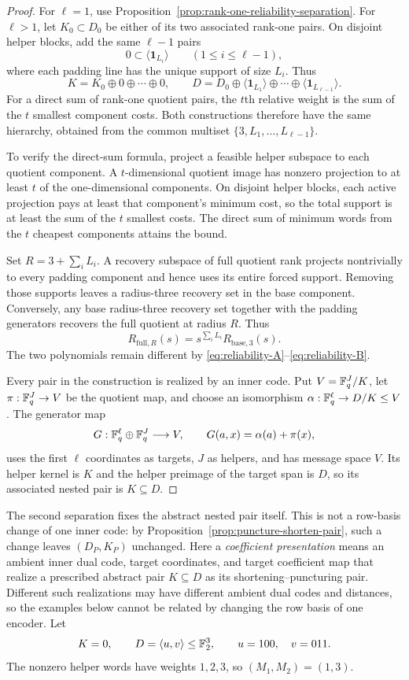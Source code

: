 \begin{proof}
For $\ell=1$, use Proposition~\ref{prop:rank-one-reliability-separation}.
For $\ell>1$, let $K_0\subset D_0$ be either of its two associated rank-one
pairs.  On disjoint helper blocks, add the same $\ell-1$ pairs
\[
 0\subset\langle\mathbf1_{L_i}\rangle
 \qquad(1\leq i\leq\ell-1),
\]
where each padding line has the unique support of size $L_i$.  Thus
\[
 K=K_0\oplus0\oplus\cdots\oplus0,
 \qquad
 D=D_0\oplus\langle\mathbf1_{L_1}\rangle\oplus\cdots
       \oplus\langle\mathbf1_{L_{\ell-1}}\rangle.
\]
For a direct sum of rank-one quotient pairs, the $t$th relative weight is the
sum of the $t$ smallest component costs.  Both constructions therefore have
the same hierarchy, obtained from the common multiset
$\{3,L_1,\ldots,L_{\ell-1}\}$.

To verify the direct-sum formula, project a feasible helper subspace to each
quotient component.  A $t$-dimensional quotient image has nonzero projection
to at least $t$ of the one-dimensional components.  On disjoint helper
blocks, each active projection pays at least that component's minimum cost,
so the total support is at least the sum of the $t$ smallest costs.  The
direct sum of minimum words from the $t$ cheapest components attains the
bound.

Set $R=3+\sum_iL_i$.  A recovery subspace of full quotient rank projects
nontrivially to every padding component and hence uses its entire forced
support.  Removing those supports leaves a radius-three recovery set in the
base component.  Conversely, any base radius-three recovery set together
with the padding generators recovers the full quotient at radius $R$.  Thus
\[
 R_{\mathrm{full},R}(s)
 =s^{\sum_iL_i}R_{\mathrm{base},3}(s).
\]
The two polynomials remain different by
\eqref{eq:reliability-A}--\eqref{eq:reliability-B}.

Every pair in the construction is realized by an inner code.  Put
$V=\mathbb F_q^J/K$, let $\pi:\mathbb F_q^J\to V$ be the quotient map, and choose an
isomorphism $\alpha:\mathbb F_q^\ell\to D/K\leq V$.  The generator map
\[
 G:\mathbb F_q^\ell\oplus\mathbb F_q^J\longrightarrow V,
 \qquad G(a,x)=\alpha(a)+\pi(x),
\]
uses the first $\ell$ coordinates as targets, $J$ as helpers, and has message
space $V$.  Its helper kernel is $K$ and the helper preimage of the target span
is $D$, so its associated nested pair is $K\subseteq D$.
%
%
\end{proof}

The second separation fixes the abstract nested pair itself.  This is not a
row-basis change of one inner code: by
Proposition~\ref{prop:puncture-shorten-pair}, such a change leaves
$(D_P,K_P)$ unchanged.  Here a \emph{coefficient presentation} means an
ambient inner dual code, target coordinates, and target coefficient map that
realize a prescribed abstract pair $K\subseteq D$ as its
shortening--puncturing pair.  Different such realizations may have different
ambient dual codes and distances, so the examples below cannot be related by
changing the row basis of one encoder.  Let
\[
 K=0,\qquad
 D=\langle u,v\rangle\leq\mathbb F_2^3,\qquad
 u=100,\quad v=011.
\]
The nonzero helper words have weights $1,2,3$, so
$(M_1,M_2)=(1,3)$.

